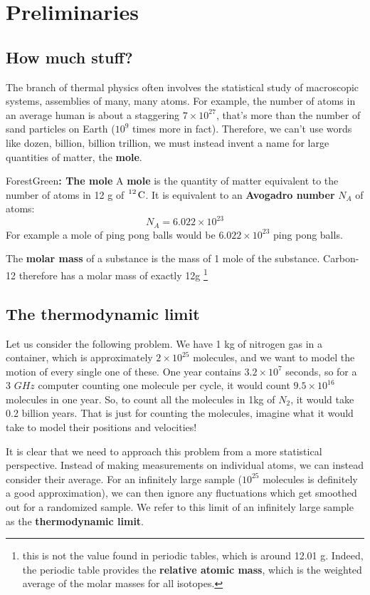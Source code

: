\documentclass[a4paper,11pt,oneside]{book}
\begin{document}
\chapter{Preliminaries}
\section{How much stuff?}
The branch of thermal physics often involves the statistical study of macroscopic systems, assemblies of many, many atoms. For example, the number of atoms in an average human is about a staggering $7\times 10^{27}$, that's more than the number of sand particles on Earth ($10^9$ times more in fact). Therefore, we can't use words like dozen, billion, billion trillion, we must instead invent a name for large quantities of matter, the \textbf{mole}.
\begin{mybox}{ForestGreen}{\textbf{: The mole}}
A \textbf{mole} is the quantity of matter equivalent to the number of atoms in 12 g of $\ce{^12 C}$. It is equivalent to an \textbf{Avogadro number} $N_A$ of atoms:
\begin{equation}
    N_A = 6.022\times 10^{23} 
\end{equation}
For example a mole of ping pong balls would be $6.022\times 10^{23}$ ping pong balls. 
\end{mybox}
The \textbf{molar mass} of a substance is the mass of 1 mole of the substance. Carbon-12 therefore has a molar mass of exactly 12g \footnote{this is not the value found in periodic tables, which is around 12.01 g. Indeed, the periodic table provides the \textbf{relative atomic mass}, which is the weighted average of the molar masses for all isotopes.}
\section{The thermodynamic limit}
Let us consider the following problem. We have 1 kg of nitrogen gas in a container, which is approximately $2\times 10^{25}$ molecules, and we want to model the motion of every single one of these. One year contains $3.2\times 10^7$ seconds, so for a 3 $GHz$ computer counting one molecule per cycle, it would count $9.5 \times 10^16$ molecules in one year. So, to count all the molecules in 1kg of $N_2$, it would take 0.2 billion years. That is just for counting the molecules, imagine what it would take to model their positions and velocities! 

It is clear that we need to approach this problem from a more statistical perspective. Instead of making measurements on individual atoms, we can instead consider their average. For an infinitely large sample ($10^25$ molecules is definitely a good approximation), we can then ignore any fluctuations which get smoothed out for a randomized sample. We refer to this limit of an infinitely large sample as the \textbf{thermodynamic limit}. 
\end{document}
